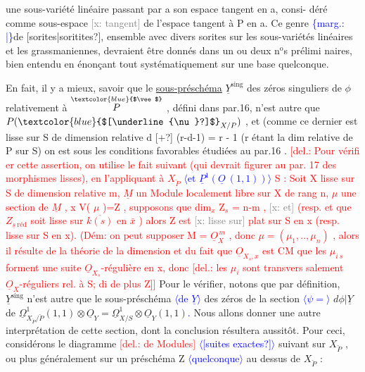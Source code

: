 \documentclass[11pt]{article}
\newcommand{\mspage}[1]{{\small\sffamily[p.\,#1]}}
\newcommand{\hand}[1]{\textcolor{blue}{#1}}
\newcommand{\inserted}[2][]{\textcolor{blue}{$\langle$#2$\rangle$}}
\newcommand{\margin}[1]{\textcolor{blue}{\{\textsf{marg.:} #1\}}}
\newcommand{\deleted}[1]{\textcolor{red}{[\textsf{del.:} #1]}}
\newcommand{\xout}[1]{\textcolor{gray}{[\textsf{x:} #1]}}
\newcommand{\uline}[1]{\underline{#1}}
\newcommand{\unsure}[1]{[#1?]}
\begin{document}
une sous-variété linéaire passant par a son espace tangent en a, consi-%
déré comme sous-espace \xout{tangent} de l'espace tangent à P en a. Ce genre
\margin{\hand{|}}de \unsure{sorites|soritites}, ensemble avec divers sorites sur les sous-variétés linéaires
et les grassmaniennes, devraient être donnés dans un ou deux n$^{\text{o}}$s prélimi
naires, bien entendu en énonçant tout systématiquement sur une base
quelconque.

En fait, il y a mieux, savoir que le \uline{sous-préschéma} $\underline{Y}^{\mathrm{sing}}$
des zéros singuliers de $\phi$ relativement à $\overset{\hand{$\vee$}}{P}$ , défini dans par.16, n'est
autre que $P(\hand{$\unsure{\underline{\nu}}$}_{X/P})$ , et (comme ce dernier est lisse sur S de dimension
relative d \unsure{$+$} (r-d-1) = r - 1 (r étant la dim relative de P sur S)
on est sous les conditions favorables étudiées au par.16 . \deleted{Pour vérifi
er cette assertion, on utilise le fait suivant (qui devrait figurer au
par. 17 des morphismes lisses), en l'appliquant à $X_{\check{P}}$ \inserted[typed]{et $\underline{P}^1(\underline{O}\ (1,1))$} S : Soit
X lisse sur S de dimension relative m, $\underline{M}$ un Module localement libre sur
X de rang n, $\mu$ une section de $\underline{M}$ , x V( $\mu$ )=Z , supposons que
dim$_x$ Z$_s$ = n-m , \xout{et} (resp. et que $Z_{\underline{s}\ \text{réd}}$ soit lisse sur $\overline{k(s)}$ en $\bar{x}$ )
alors Z est \xout{lisse sur} plat sur S en x (resp. lisse sur S en x). (Dém:
on peut supposer M = $\underline{O}_X^{\,m}$ , donc $\mu = (\mu_1,..,\mu_n)$ , alors il résulte de
la théorie de la dimension et du fait que $\underline{O}_{X_s,x}$ est CM que les
$\mu_{i\ s}$ forment une suite $\underline{O}_{X_s}$-régulière en x, donc \deleted{les $\mu_i$ sont transvers
salement $\underline{O}_X$-réguliers rel. à S; di de plus Z}} Pour le vérifier,
notons que par définition, $\underline{Y}^{\mathrm{sing}}$ n'est autre que le sous-préschéma \inserted{de $\underline{Y}$}
des zéros de la section \inserted{$\psi =$} $d\phi|\underline{Y}$ de $\underline{\Omega}^1_{X_{\check{P}}/\check{P}}(1,1)\otimes \underline{O}_Y = \underline{\Omega}^1_{X/S}\otimes\underline{O}_Y(1,1)$\hand{.}
Nous allons donner une autre interprétation de cette section, dont
la conclusion résultera aussitôt. Pour ceci, considérons le diagramme
\deleted{de Modules} \inserted{\unsure{suites exactes}}
suivant sur $X_{\check{P}}$ , ou plus généralement sur un préschéma Z \inserted{quelconque} au dessus de
$X_{\check{P}}$ :

\mspage{\hand{39}}
\end{document}
